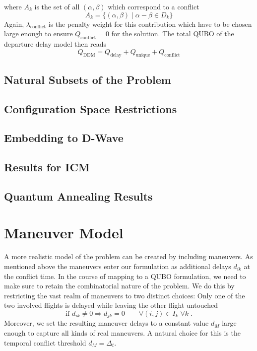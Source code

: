 \documentclass[aps,pra,twocolumn,10pt]{revtex4-1}
\begin{document}
where $A_k$ is the set of all $(\alpha, \beta)$ which correspond to a conflict
\begin{equation*}
    A_k = \{(\alpha, \beta) \; | \; \alpha - \beta \in D_k\}
\end{equation*}
Again, $\lambda_\text{conflict}$ is the penalty weight for this contribution which have to be chosen large enough to ensure $Q_\text{conflict}=0$ for the solution.
The total QUBO of the departure delay model then reads
\begin{equation*}
    Q_\text{DDM} = Q_\text{delay} + Q_\text{unique} + Q_\text{conflict}
\end{equation*}

\subsection{Natural Subsets of the Problem}
\subsection{Configuration Space Restrictions}
\subsection{Embedding to D-Wave}
\subsection{Results for ICM}
\subsection{Quantum Annealing Results}

\section{Maneuver Model}
A more realistic model of the problem can be created by including maneuvers.
As mentioned above the maneuvers enter our formulation as additional delays $d_{ik}$ at the conflict time.
In the course of mapping to a QUBO formulation, we need to make sure to retain the combinatorial nature of the problem.
We do this by restricting the vast realm of maneuvers to two distinct choices:
Only one of the two involved flights is delayed while leaving the other flight untouched
\begin{equation} \label{eqn:maneuver_model_maneuver_decision}
    \text{if } d_{ik} \neq 0 \Rightarrow d_{jk} = 0  \qquad \forall (i, j) \in I_k \; \forall k \; .
\end{equation}
Moreover, we set the resulting maneuver delays to a constant value $d_M$ large enough to capture all kinds of real maneuvers.
A natural choice for this is the temporal conflict threshold $d_M = \Delta_t$.
\end{document}
